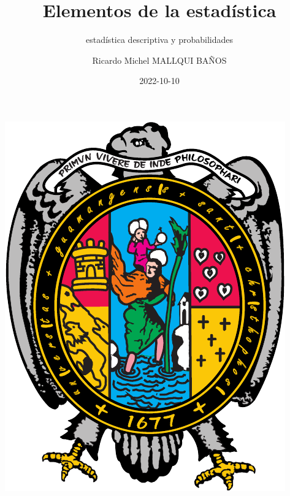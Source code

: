 \documentclass[
  11pt,
]{krantz}
\title{Elementos de la estadística}
\subtitle{estadística descriptiva y probabilidades}
\author{Ricardo Michel MALLQUI BAÑOS}
\date{2022-10-10}
\theoremstyle{definition}
\theoremstyle{definition}
\theoremstyle{definition}
\theoremstyle{definition}
\theoremstyle{remark}
\begin{document}
\maketitle

\thispagestyle{empty}
\begin{center}
\includegraphics{U.pdf}
\end{center}


{
\hypersetup{linkcolor=}
\setcounter{tocdepth}{2}
\tableofcontents
}
\listoftables
\listoffigures
\newcommand{\N}{\mathbb{N}}
\newcommand{\R}{\mathbb{R}}
\newcommand{\CC}{\mathbb{C}}
\newcommand{\I}{\mathbb{I}}
\newcommand{\f}{\mathbb{f}}
\newcommand{\X}{\mathbb{X}}
\newcommand{\D}{\mathbb{D}}
\newcommand{\Z}{\mathbb{Z}}
\newcommand{\Q}{\mathbb{Q}}
\newcommand{\norm}[1]{\left\Vert#1\right\Vert}
\newcommand{\abs}[1]{\left\vert#1\right\vert}
\newcommand{\set}[1]{\left\{#1\right\}}
\newcommand{\seq}[1]{\left<#1\right>}
\newcommand{\co}[1]{\left[#1\right]}
\newcommand{\cc}[1]{\left(#1\right)}
\newcommand{\J}{\mathcal{J}}
\newcommand{\K}{\mathcal{K}}
\newcommand{\M}{\mathcal{M}}
\newcommand{\F}{\mathcal{F}}
\end{document}
